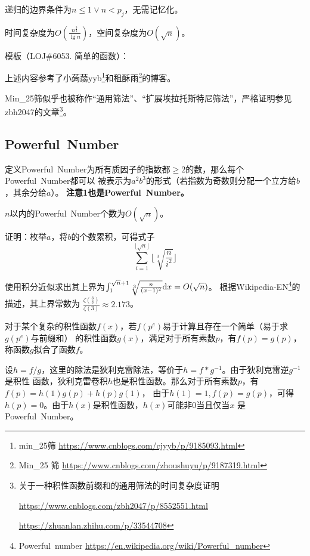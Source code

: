 递归的边界条件为$n\leq 1 \vee n<p_j$，无需记忆化。

时间复杂度为$O(\frac{n^\frac{3}{4}}{\lg n})$，空间复杂度为$O(\sqrt{n})$。

模板（LOJ\#6053. 简单的函数）：


上述内容参考了小蒟蒻yyb\footnote{
    min\_25筛
    \url{https://www.cnblogs.com/cjyyb/p/9185093.html}
}和租酥雨\footnote{
    Min\_25 筛
    \url{https://www.cnblogs.com/zhoushuyu/p/9187319.html}
}的博客。

Min\_25筛似乎也被称作``通用筛法''、``扩展埃拉托斯特尼筛法''，严格证明参见
zbh2047的文章\footnote{关于一种积性函数前缀和的通用筛法的时间复杂度证明

    \url{https://www.cnblogs.com/zbh2047/p/8552551.html}

    \url{https://zhuanlan.zhihu.com/p/33544708}}。
\subsection{Powerful~Number}
定义Powerful~Number为所有质因子的指数都$\geq 2$的数，那么每个Powerful~Number都可以
被表示为$a^2b^3$的形式（若指数为奇数则分配一个立方给$b$，其余分给$a$）。
{\bfseries 注意1也是Powerful~Number。}

\begin{theorem}
    $n$以内的Powerful~Number个数为$O(\sqrt{n})$。
\end{theorem}

证明：枚举$a$，将$b$的个数累积，可得式子
\begin{displaymath}
    \sum_{i=1}^{\lfloor\sqrt{n}\rfloor}{\lfloor\sqrt[3]{\frac{n}{i^2}}\rfloor}
\end{displaymath}

使用积分近似求出其上界为$\int_1^{\sqrt{n}+1}{\sqrt[3]{\frac{n}{(x-1)^2}} \textrm{d} x}=O(\sqrt{n})$。
根据Wikipedia-EN\footnote{Powerful~number
    \url{https://en.wikipedia.org/wiki/Powerful\_number}}的描述，其上界常数为
    $\frac{\zeta(\frac{3}{2})}{\zeta(3)}\approx 2.173$。

对于某个复杂的积性函数$f(x)$，若$f(p^e)$易于计算且存在一个简单（易于求$g(p^e)$与前缀和）
的积性函数$g(x)$，满足对于所有素数$p$，有$f(p)=g(p)$，称函数$g$拟合了函数$f$。

设$h=f/g$，这里的除法是狄利克雷除法，等价于$h=f*g^{-1}$。由于狄利克雷逆$g^{-1}$是积性
函数，狄利克雷卷积$h$也是积性函数。那么对于所有素数$p$，有$f(p)=h(1)g(p)+h(p)g(1)$，
由于$h(1)=1,f(p)=g(p)$，可得$h(p)=0$。由于$h(x)$是积性函数，$h(x)$可能非0当且仅当$x$
是Powerful~Number。

